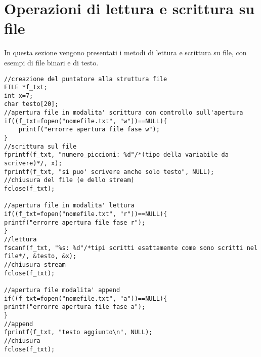 \section{Operazioni di lettura e scrittura su file}
In questa sezione vengono presentati i metodi di lettura e scrittura su file, con esempi di file binari e di testo.
\begin{lstlisting}[title={File di testo (.txt)}]
//creazione del puntatore alla struttura file
FILE *f_txt;
int x=7;
char testo[20];
//apertura file in modalita' scrittura con controllo sull'apertura
if((f_txt=fopen("nomefile.txt", "w"))==NULL){
	printf("errorre apertura file fase w");
}
//scrittura sul file
fprintf(f_txt, "numero_piccioni: %d"/*(tipo della variabile da scrivere)*/, x);
fprintf(f_txt, "si puo' scrivere anche solo testo", NULL);
//chiusura del file (e dello stream)
fclose(f_txt);

//apertura file in modalita' lettura 
if((f_txt=fopen("nomefile.txt", "r"))==NULL){
printf("errorre apertura file fase r");
}
//lettura
fscanf(f_txt, "%s: %d"/*tipi scritti esattamente come sono scritti nel file*/, &testo, &x);
//chiusura stream
fclose(f_txt);

//apertura file modalita' append
if((f_txt=fopen("nomefile.txt", "a"))==NULL){
printf("errorre apertura file fase a");
}
//append
fprintf(f_txt, "testo aggiunto\n", NULL);
//chiusura
fclose(f_txt);
\end{lstlisting}
\begin{lstlisting}[title={File binari (.bin)}]



\end{lstlisting}